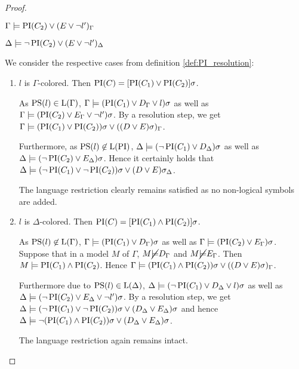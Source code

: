 \begin{proof}
\begin{itemize}
			$\Gamma \models \operatorname{PI}(C_2) \lor (E\lor \lnot l')_\Gamma$

			$\Delta \models \lnot \operatorname{PI}(C_2) \lor (E\lor \lnot l')_\Delta$

			We consider the respective cases from definition \ref{def:PI_resolution}:

			\begin{enumerate}
				\item $l$ is $\Gamma$-colored.
					\label{huang_proof_prop_case_1}
					Then $\operatorname{PI}(C) = [\operatorname{PI}(C_1) \lor \operatorname{PI}(C_2)]\sigma$. 

					As $\operatorname{PS}(l) \in \operatorname{L}(\Gamma)$,
					$\Gamma \models (\operatorname{PI}(C_1) \lor D_\Gamma\lor l)\sigma$
					as well as $\Gamma \models (\operatorname{PI}(C_2) \lor E_\Gamma\lor \lnot l')\sigma$.
					By a resolution step, we get $\Gamma \models (\operatorname{PI}(C_1) \lor \operatorname{PI}(C_2))\sigma \lor ((D \lor E)\sigma)_\Gamma$.

					Furthermore, as $\operatorname{PS}(l) \not\in \operatorname{L}(\operatorname{PI})$, 
					$\Delta \models (\lnot\operatorname{PI}(C_1) \lor D_\Delta)\sigma$
					as well as $\Delta \models (\lnot\operatorname{PI}(C_2) \lor E_\Delta)\sigma$.
					Hence it certainly holds that $\Delta \models (\lnot \operatorname{PI}(C_1) \lor \lnot\operatorname{PI}(C_2))\sigma \lor (D \lor E)\sigma_\Delta$.

					The language restriction clearly remains satisfied as no non-logical symbols are added.

				\item $l$ is $\Delta$-colored.
					\label{huang_proof_prop_case_2}
					Then $\operatorname{PI}(C) = [\operatorname{PI}(C_1) \land \operatorname{PI}(C_2)]\sigma$. 

					As $\operatorname{PS}(l) \not\in \operatorname{L}(\Gamma)$,
					$\Gamma \models (\operatorname{PI}(C_1) \lor D_\Gamma)\sigma$
					as well as $\Gamma \models (\operatorname{PI}(C_2) \lor E_\Gamma)\sigma$.
					Suppose that in a model $M$ of $\Gamma$, $M \cancel {\models} D_\Gamma$ and $M \cancel {\models} E_\Gamma$. Then $M \models \operatorname{PI}(C_1) \land \operatorname{PI}(C_2)$.
					Hence 
					$\Gamma \models (\operatorname{PI}(C_1) \land \operatorname{PI}(C_2))\sigma \lor ((D \lor E)\sigma)_\Gamma$.

					Furthermore due to $\operatorname{PS}(l) \in \operatorname{L}(\Delta)$,
					$\Delta \models (\lnot\operatorname{PI}(C_1) \lor D_\Delta \lor l)\sigma$
					as well as $\Delta \models (\lnot\operatorname{PI}(C_2) \lor E_\Delta \lor \lnot l')\sigma$.
					By a resolution step, we get $\Delta \models (\lnot\operatorname{PI}(C_1) \lor \lnot\operatorname{PI}(C_2))\sigma \lor (D_\Delta \lor E_\Delta)\sigma $
					and hence 
					$\Delta \models \lnot (\operatorname{PI}(C_1) \land \operatorname{PI}(C_2))\sigma \lor (D_\Delta \lor E_\Delta)\sigma $.

					The language restriction again remains intact.


\end{enumerate}
\end{itemize}
\end{proof}
